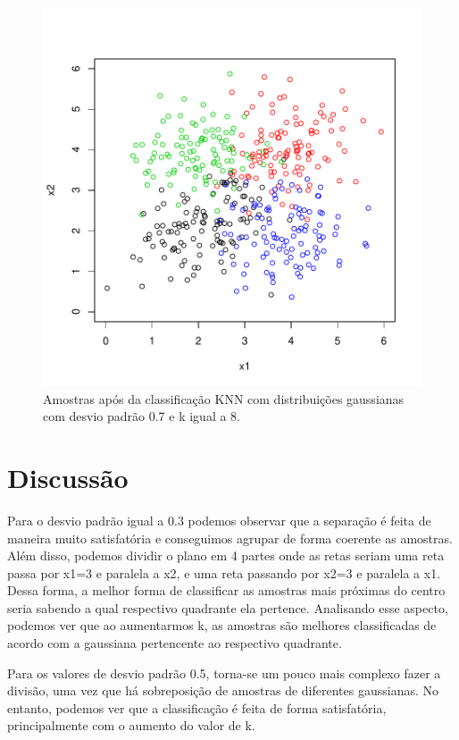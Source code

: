 \documentclass[12pt]{article}
\begin{document}
\begin{figure}[h]
\centering
\includegraphics{knn-021}
\caption{Amostras após da classificação KNN com distribuições gaussianas com desvio padrão 0.7 e k igual a 8.}
\label{sd_0.7}
\end{figure}

\section{Discussão}
  \par Para o desvio padrão igual a 0.3 podemos observar que a separação é feita de maneira muito satisfatória e conseguimos agrupar de forma coerente as amostras. Além disso, podemos dividir o plano em 4 partes onde as retas seriam uma reta passa por x1=3 e paralela a x2, e uma reta passando por x2=3 e paralela a x1. Dessa forma, a melhor  forma de classificar as amostras mais próximas do centro seria sabendo a qual respectivo quadrante ela pertence. Analisando esse aspecto, podemos ver que ao aumentarmos k, as amostras são melhores classificadas de acordo com a gaussiana pertencente ao respectivo quadrante. 
  
  \par Para os valores de desvio padrão 0.5, torna-se um pouco mais complexo fazer a divisão, uma vez que há sobreposição de amostras de diferentes gaussianas. No entanto, podemos ver que a classificação é feita de forma satisfatória, principalmente com o aumento do valor de k. 
  
\end{document}

